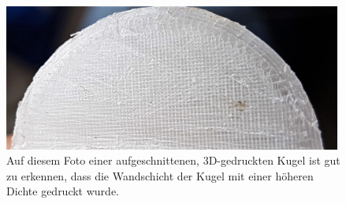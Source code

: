 \begin{figure}[htbp]
\vspace*{0.2cm}
\centering
 \includegraphics[width=0.99\textwidth]{images/fail.jpg}
  \caption[Aufgeschnittene Kugel aus dem 3D-Drucker]{Auf diesem Foto einer aufgeschnittenen, 3D-gedruckten Kugel ist gut zu erkennen, dass die Wandschicht der Kugel mit einer höheren Dichte gedruckt wurde.}
  \label{fig:fail}
  \vspace{-0pt}
\end{figure}